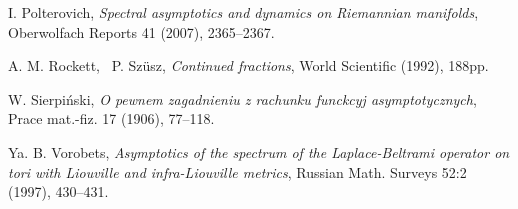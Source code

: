 \documentclass[12pt]{amsart}
\numberwithin{equation}{subsection}
\theoremstyle{definition}
\theoremstyle{plain}
\begin{document}
\begin{thebibliography}{[AHU]}
 I. Polterovich,  {\em{Spectral asymptotics and dynamics  on Riemannian manifolds}}, Oberwolfach Reports 41 (2007),  2365--2367.

 A. M. Rockett, \ P. Sz\"usz, {\em{Continued fractions}}, World Scientific (1992), 188pp.

 W. Sierpi\'nski, {\em{O pewnem zagadnieniu z rachunku funckcyj asymptotycznych}}, Prace mat.-fiz. 17 (1906), 77--118.

 Ya. B. Vorobets,  {\em{Asymptotics of the spectrum of the Laplace-Beltrami operator on tori
with Liouville and infra-Liouville metrics}}, Russian Math. Surveys 52:2 (1997), 430--431.

\end{thebibliography}
\end{document}
